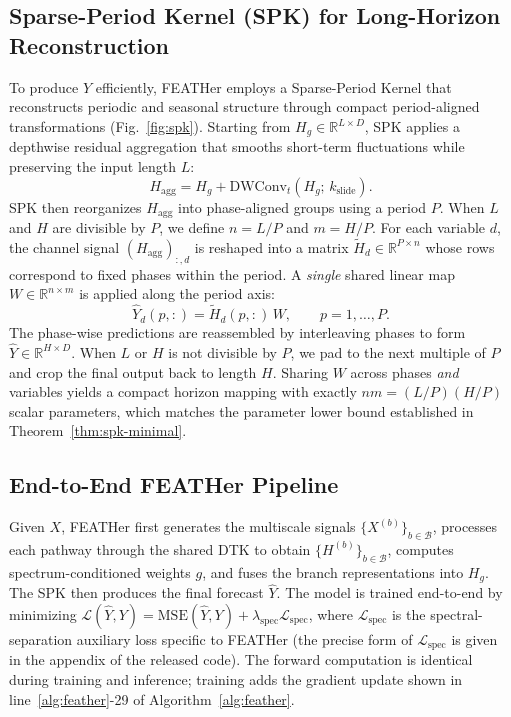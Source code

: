 \documentclass[journal]{IEEEtran}
\theoremstyle{remark}
\begin{document}
\subsection{Sparse-Period Kernel (SPK) for Long-Horizon Reconstruction}
\label{subsec:spk}
To produce $\widehat Y$ efficiently, FEATHer employs a Sparse-Period
Kernel that reconstructs periodic and seasonal structure through
compact period-aligned transformations (Fig.~\ref{fig:spk}). Starting
from $H_g \in \mathbb{R}^{L \times D}$, SPK applies a depthwise
residual aggregation that smooths short-term fluctuations while
preserving the input length $L$:
\begin{equation}
\label{eq:spk-residual}
H_{\mathrm{agg}} = H_g + \mathrm{DWConv}_t(H_g;\, k_{\mathrm{slide}}).
\end{equation}
SPK then reorganizes $H_{\mathrm{agg}}$ into phase-aligned groups using
a period $P$. When $L$ and $H$ are divisible by $P$, we define
$n = L/P$ and $m = H/P$. For each variable $d$, the channel signal
$(H_{\mathrm{agg}})_{:,d}$ is
reshaped into a matrix $\widetilde H_d \in \mathbb{R}^{P \times n}$
whose rows correspond to fixed phases within the period. A
\emph{single} shared linear map $W \in \mathbb{R}^{n \times m}$ is
applied along the period axis:
\begin{equation}
\label{eq:spk-linear}
\widehat Y_d(p, :) = \widetilde H_d(p, :)\, W,
\qquad p = 1, \ldots, P.
\end{equation}
The phase-wise predictions are reassembled by interleaving phases
to form $\widehat Y \in \mathbb{R}^{H \times D}$. When $L$ or $H$ is
not divisible by $P$, we pad to the next multiple of $P$ and crop
the final output back to length $H$. Sharing $W$ across phases
\emph{and} variables yields a compact horizon mapping with exactly
$nm = (L/P)(H/P)$ scalar parameters, which matches the parameter
lower bound established in Theorem~\ref{thm:spk-minimal}.

\subsection{End-to-End FEATHer Pipeline}
Given $X$, FEATHer first generates the multiscale signals
$\{X^{(b)}\}_{b \in \mathcal{B}}$, processes each pathway through the
shared DTK to obtain $\{H^{(b)}\}_{b \in \mathcal{B}}$, computes
spectrum-conditioned weights $g$, and fuses the branch
representations into $H_g$. The SPK then produces the final forecast
$\widehat Y$. The model is trained end-to-end by minimizing
$\mathcal{L}(\widehat Y, Y) = \mathrm{MSE}(\widehat Y, Y) +
\lambda_{\mathrm{spec}} \mathcal{L}_{\mathrm{spec}}$, where
$\mathcal{L}_{\mathrm{spec}}$ is the spectral-separation auxiliary
loss specific to FEATHer
(the precise form of $\mathcal{L}_{\mathrm{spec}}$ is given in the
appendix of the released code). The forward computation is identical
during training and inference; training adds the gradient update
shown in line~\ref{alg:feather}-29 of Algorithm~\ref{alg:feather}.
\end{document}
